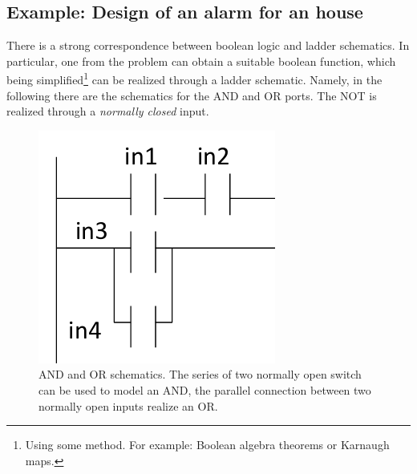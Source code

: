 \subsection{Example: Design of an alarm for an house}
\begin{remark}
    There is a strong correspondence between boolean logic and ladder schematics. In particular, one from the problem can obtain a suitable boolean function, which being simplified\footnote{
    Using some method. For example: Boolean algebra theorems or Karnaugh maps.
    } can be realized through a ladder schematic. Namely, in the following there are the schematics for the AND and OR ports. The NOT is realized through a \textit{normally closed} input. 
\end{remark}



\begin{figure}[h]
    \centering
    \includegraphics[scale=0.7]{img/and_or.png}
    \caption{AND and OR schematics. The series of two normally open switch can be used to model an AND, the parallel connection between two normally open inputs realize an OR.}
\end{figure}

